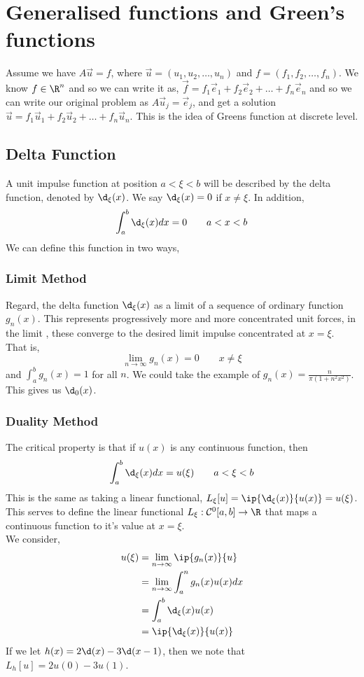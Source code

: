 
\section{Generalised functions and Green's functions}
Assume we have $A\vec u = f$, where $\vec u = (u_1, u_2, \dots, u_n)$ and $f = (f_1, f_2, \dots, f_n)$. We know $f \in \R^n$ and so we can write it as, $\vec f = f_1\vec e_1 + f_2\vec e_2 + \dots + f_n\vec e_n$ and so we can write our original problem as $A\vec u_j = \vec e_j$, and get a solution $\vec u = f_1\vec u_1 + f_2\vec u_2 + \dots + f_n \vec u_n$. This is the idea of Greens function at discrete level.\\

\noindent
\subsection{Delta Function}
A unit impulse function at position $a < \xi < b$ will be described by the delta function, denoted by $\d_\xi (x)$. We say $\d_\xi (x) = 0$ if $x \ne \xi$. In addition,
$$ \int_a^b \d_\xi (x)dx = 0 \qquad a < x < b $$
We can define this function in two ways,
\subsubsection{Limit Method}
Regard, the delta function $\d_\xi (x)$ as a limit of a sequence of ordinary function $g_n(x)$. This represents progressively more and more concentrated unit forces, in the limit , these converge to the desired limit impulse concentrated at $x = \xi$. That is,
$$ \lim_{n \to \infty} g_n(x) = 0 \qquad x \ne \xi $$
and $\int_a^b g_n(x) = 1$ for all $n$. We could take the example of $g_n(x) = \frac{n}{\pi (1 + n^2x^2)}$. This gives us $\d_0(x)$.

\subsubsection{Duality Method}
The critical property is that if $u(x)$ is any continuous function, then
$$ \int_a^b \d_\xi (x) dx = u(\xi) \qquad a < \xi < b $$
This is the same as taking a linear functional, $L_\xi [u] = \ip{\d_\xi (x)}{u(x)} = u(\xi)$. This serves to define the linear functional $L_\xi : \mathcal{C}^0 [a, b] \to \R$ that maps a continuous function to it's value at $x = \xi$. \\

\noindent
We consider,
\begin{align*}
  u(\xi) &= \lim_{n \to \infty} \ip{g_n(x)}{u}\\
  &= \lim_{n \to \infty} \int_a^n g_n(x)u(x)dx \\
  &= \int_a^b \d_\xi(x)u(x)\\
  &= \ip{\d_\xi (x)}{u(x)}
\end{align*}
If we let $h(x) = 2\d (x) - 3\d(x - 1)$, then we note that $L_h[u] = 2u(0) - 3u(1)$.

